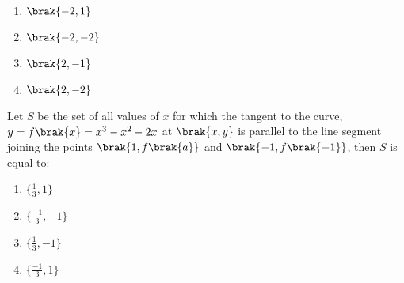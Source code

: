 \hfill {}
\begin{multicols}{2}
\begin{enumerate}
    \item $\brak{-2,1}$
    \item $\brak{-2,-2}$
    \item $\brak{2,-1}$ 
    \item $\brak{2,-2 }$
\end{enumerate}
\end{multicols}
\item Let $S$ be the set of all values of $x$ for which the tangent to the curve, $y=f\brak{x}=x^{3}-x^{2}-2x$ at $\brak{x,y}$ is parallel to the line segment joining the points $\brak{1,f\brak{a}}$ and $\brak{-1,f\brak{-1}}$, then $S$ is equal to:

\hfill {}
\begin{multicols}{2}
\begin{enumerate}
    \item $\{\frac{1}{3},1\}$
    \item $\{\frac{-1}{3},-1\}$
    \item $\{\frac{1}{3},-1\}$ 
    \item $\{\frac{-1}{3},1\}$
\end{enumerate}
\end{multicols}

